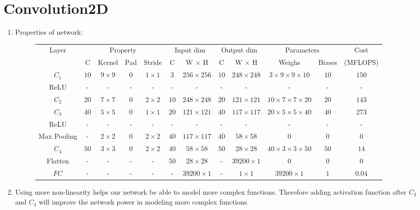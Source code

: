 \documentclass[12]{article}
\begin{document}
	\section{Convolution2D}
	\begin{enumerate}[label=\textbf{(\alph*)}]
		\item Properties of network:
		\hskip-4.0cm
		\begin{figure}[H]
		\begin{adjustwidth}{-2.25cm}{}
			\centering
			\begin{tabular}{|c|c|c|c|c|c|c|c|c|c|c|c|}
				\hline
				\multirow{2}{*}{Layer} & \multicolumn{4}{|c|}{Property} & \multicolumn{2}{|c|}{Input dim} & \multicolumn{2}{|c|}{Output dim} &
				\multicolumn{2}{|c|}{Parameters} &
				Cost\\
				& C & Kernel & Pad & Stride & C & W $\times $ H & C & W $\times$ H & Weighs & Biases & (MFLOPS)\\
				\hline\hline
				$C_1$ & $10$ & $9\times 9$ & $0$ & $1\times 1$ & $3$ & $256\times 256$ & $10$ & $248\times 248$ & $3\times 9 \times 9 \times 10$&$10$&$150$\\
				{\ttfamily ReLU} & - & - & - & - & - & - & - & - & - & - & - \\
				$C_2$ &$20$&$7\times 7$&$0$&$2\times 2$&$10$&$248\times 248$&$20$&$121\times 121$&$10\times 7\times 7\times 20$&$20$&$143$\\
				$C_3$ &$40$&$5\times 5$&$0$&$1\times 1$&$20$&$121\times 121$&$40$&$117\times 117$&$20 \times 5\times 5\times 40$&$40$&$273$\\
				{\ttfamily ReLU} & - & - & - & - & - & - & - & - & - & - & - \\
				{\ttfamily Max Pooling}	& - &$2\times 2$&$0$&$2\times 2$&$40$&$117\times 117$&$40$&$58\times 58$&$0$&$0$&$0$\\
				$C_4$ &$50$&$3\times 3$&$0$&$2\times 2$&$40$&$58\times 58$&$50$&$28\times 28$&$40\times 3\times 3\times 50$&$50$&$14$\\
				{\ttfamily Flatten} &-&-&-&-&$50$&$28\times 28$&-&$39200\times 1$&$0$&$0$&$0$\\
				$FC$ &-&-&-&-&-&$39200\times 1$&-&$1\times 1$&$39200\times 1$&$1$&$0.04$\\
				\hline
			\end{tabular}
		\end{adjustwidth}
		\end{figure}
		\item
		Using more non-linearity helps our network be able to model more complex functions. Therefore adding activation function after $C_2$ and $C_4$ will improve the network power in modeling more complex functions.
	\end{enumerate}
	
\end{document}
